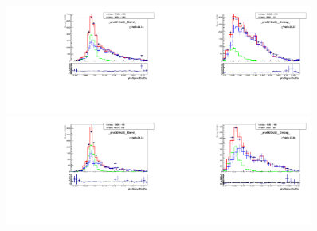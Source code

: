 \begin{figure}[htb]
  \begin{center}
   \includegraphics[width=0.45\textwidth]{../figs/figs_v11/ELECTRON_WGamma/TemplateFits/c_TEMPL_SIHIH_UNblind__phoEt15to20__Barrel__RooFit.pdf}\includegraphics[width=0.45\textwidth]{../figs/figs_v11/ELECTRON_WGamma/TemplateFits/c_TEMPL_SIHIH_UNblind__phoEt15to20__Endcap__RooFit.pdf}\\
   \includegraphics[width=0.45\textwidth]{../figs/figs_v11/ELECTRON_WGamma/TemplateFits/c_TEMPL_SIHIH_UNblind__phoEt20to25__Barrel__RooFit.pdf}\includegraphics[width=0.45\textwidth]{../figs/figs_v11/ELECTRON_WGamma/TemplateFits/c_TEMPL_SIHIH_UNblind__phoEt20to25__Endcap__RooFit.pdf}\\

\end{center}
\end{figure}
